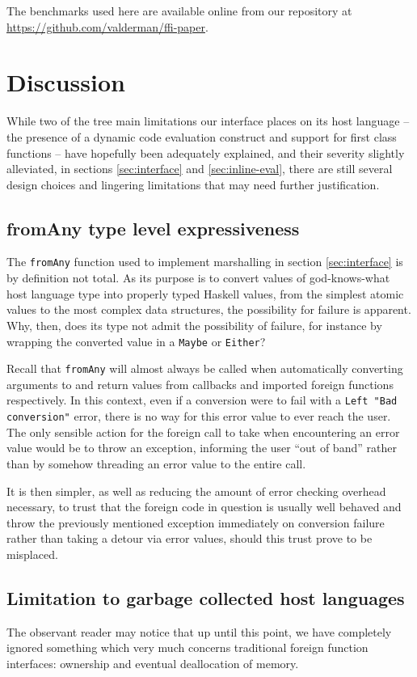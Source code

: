 \documentclass[preprint]{sigplanconf}
\begin{document}
The benchmarks used here are available online from our repository at
\url{https://github.com/valderman/ffi-paper}.

\section{Discussion}\label{sec:discussion}
While two of the tree main limitations our interface places on its host
language -- the presence of a dynamic code evaluation construct and support for
first class functions -- have hopefully been adequately explained, and their
severity slightly alleviated, in sections \ref{sec:interface} and
\ref{sec:inline-eval}, there are still several design choices and lingering
limitations that may need further justification.

\subsection{fromAny type level expressiveness}
The \lstinline!fromAny! function used to implement marshalling in section
\ref{sec:interface} is by definition not total. As its purpose is to
convert values of god-knows-what host language type into properly typed Haskell
values, from the simplest atomic values to the most complex data structures,
the possibility for failure is apparent. Why, then, does its type not admit
the possibility of failure, for instance by wrapping the converted value in a
\lstinline!Maybe! or \lstinline!Either!?

Recall that \lstinline!fromAny! will almost always be called when
automatically converting arguments to and return values from callbacks and
imported foreign functions respectively. In this context, even if a conversion
were to fail with a \lstinline!Left "Bad conversion"! error, there is no way
for this error value to ever reach the user. The only sensible action for the
foreign call to take when encountering an error value would be to throw an
exception, informing the user ``out of band'' rather than by somehow threading
an error value to the entire call.

It is then simpler, as well as reducing the amount of error checking overhead
necessary, to trust that the foreign code in question is usually well behaved
and throw the previously mentioned exception immediately on conversion failure
rather than taking a detour via error values,
should this trust prove to be misplaced.

\subsection{Limitation to garbage collected host languages}
\label{sec:host-gc}
The observant reader may notice that up until this point, we have completely
ignored something which very much concerns traditional foreign function
interfaces: ownership and eventual deallocation of memory.
\end{document}
